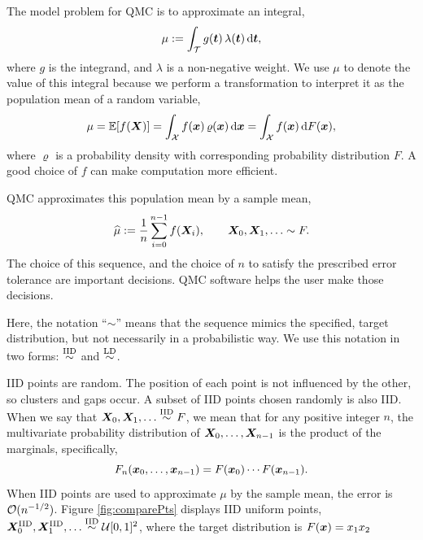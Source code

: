 \documentclass[graybox,footinfo]{svmult}
\newcommand{\hmu}{\widehat{\mu}}
\newcommand{\IID}{\textup{IID}}
\newcommand{\LD}{\textup{LD}}
\newcommand{\IIDsim}{\overset{\IID}{\sim}}
\newcommand{\LDsim}{\overset{\LD}{\sim}}
\begin{document}
The model problem for QMC is to approximate an integral,
\begin{equation} \label{eq:integral}
	\mu := \int_\calT g(\bst) \, \lambda(\bst) \, \D \bst,
\end{equation}
where $g$ is the integrand, and $\lambda$ is a non-negative weight.  We use $\mu$ to denote the value of this integral because we perform a transformation to interpret it as the population mean of a random variable, 
\begin{equation} \label{eq:fintegral}
	\mu = \bbE[f(\bsX)] = \int_\calX f(\bsx) \, \varrho(\bsx) \, \D \bsx =  \int_\calX f(\bsx) \,  \D F(\bsx) ,
\end{equation}
where $\varrho$ is a probability density with corresponding probability distribution $F$. 
A good choice of $f$ can make computation more efficient.

QMC approximates this population mean by a sample mean,
\begin{equation} \label{eq:samplemean}
	\hmu := \frac 1n \sum_{i=0}^{n-1} f(\bsX_i), \qquad \bsX_0, \bsX_1, \ldots \sim F.
\end{equation}
The choice of this sequence, and the choice of $n$ to satisfy  the prescribed error tolerance are important decisions.  QMC software helps the user make those decisions.

Here, the notation ``$\sim$'' means that the sequence mimics the specified, target distribution, but not necessarily in a probabilistic way.  We  use this notation in two forms:  $\IIDsim$ and $\LDsim$.

IID points are random. The position of each point is not influenced by the other, so clusters and gaps occur.  A subset of IID points chosen randomly is also IID.  When we say that $\bsX_0, \bsX_1, \ldots \IIDsim F$, we mean that for any positive integer $n$, the  multivariate probability distribution of ${\boldsymbol{X}}_0, \ldots, {\boldsymbol{X}}_{n-1}$ is the product of the marginals, specifically,
\begin{equation*}
	F_{n}({\boldsymbol{x}}_0, \ldots, {\boldsymbol{x}}_{n-1}) = F({\boldsymbol{x}}_0) \cdots  F({\boldsymbol{x}}_{n-1}).
\end{equation*}
When IID points are used to approximate $\mu$ by the sample mean, the error is ${\mathcal{O}}(n^{-1/2})$.  Figure \ref{fig:comparePts} displays IID uniform points, $\bsX^{\IID}_0, \bsX^{\IID}_1, \ldots \IIDsim \calU[0,1]^2$, where the target distribution is $F({\boldsymbol{x}}) = x_1 x_2$
\end{document}
